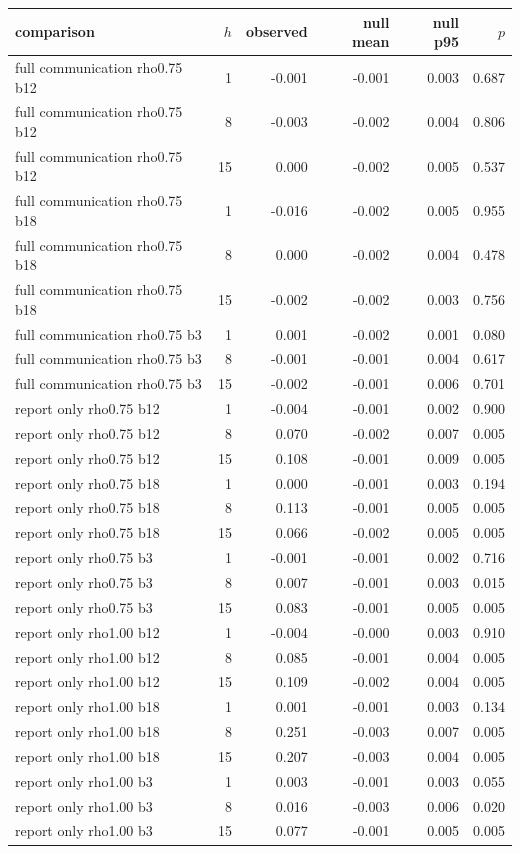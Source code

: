 \begin{tabular}{lrrrrr}
\toprule
comparison & $h$ & observed & null mean & null p95 & $p$ \\
\midrule
full communication rho0.75 b12 & 1 & -0.001 & -0.001 & 0.003 & 0.687 \\
full communication rho0.75 b12 & 8 & -0.003 & -0.002 & 0.004 & 0.806 \\
full communication rho0.75 b12 & 15 & 0.000 & -0.002 & 0.005 & 0.537 \\
full communication rho0.75 b18 & 1 & -0.016 & -0.002 & 0.005 & 0.955 \\
full communication rho0.75 b18 & 8 & 0.000 & -0.002 & 0.004 & 0.478 \\
full communication rho0.75 b18 & 15 & -0.002 & -0.002 & 0.003 & 0.756 \\
full communication rho0.75 b3 & 1 & 0.001 & -0.002 & 0.001 & 0.080 \\
full communication rho0.75 b3 & 8 & -0.001 & -0.001 & 0.004 & 0.617 \\
full communication rho0.75 b3 & 15 & -0.002 & -0.001 & 0.006 & 0.701 \\
report only rho0.75 b12 & 1 & -0.004 & -0.001 & 0.002 & 0.900 \\
report only rho0.75 b12 & 8 & 0.070 & -0.002 & 0.007 & 0.005 \\
report only rho0.75 b12 & 15 & 0.108 & -0.001 & 0.009 & 0.005 \\
report only rho0.75 b18 & 1 & 0.000 & -0.001 & 0.003 & 0.194 \\
report only rho0.75 b18 & 8 & 0.113 & -0.001 & 0.005 & 0.005 \\
report only rho0.75 b18 & 15 & 0.066 & -0.002 & 0.005 & 0.005 \\
report only rho0.75 b3 & 1 & -0.001 & -0.001 & 0.002 & 0.716 \\
report only rho0.75 b3 & 8 & 0.007 & -0.001 & 0.003 & 0.015 \\
report only rho0.75 b3 & 15 & 0.083 & -0.001 & 0.005 & 0.005 \\
report only rho1.00 b12 & 1 & -0.004 & -0.000 & 0.003 & 0.910 \\
report only rho1.00 b12 & 8 & 0.085 & -0.001 & 0.004 & 0.005 \\
report only rho1.00 b12 & 15 & 0.109 & -0.002 & 0.004 & 0.005 \\
report only rho1.00 b18 & 1 & 0.001 & -0.001 & 0.003 & 0.134 \\
report only rho1.00 b18 & 8 & 0.251 & -0.003 & 0.007 & 0.005 \\
report only rho1.00 b18 & 15 & 0.207 & -0.003 & 0.004 & 0.005 \\
report only rho1.00 b3 & 1 & 0.003 & -0.001 & 0.003 & 0.055 \\
report only rho1.00 b3 & 8 & 0.016 & -0.003 & 0.006 & 0.020 \\
report only rho1.00 b3 & 15 & 0.077 & -0.001 & 0.005 & 0.005 \\
\bottomrule
\end{tabular}